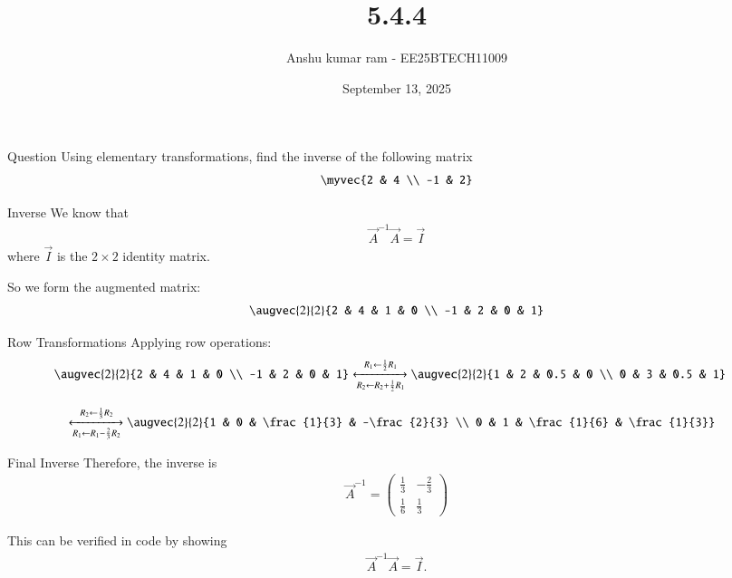 \documentclass{beamer}
\title{5.4.4}
\date{September 13, 2025}
\author{Anshu kumar ram - EE25BTECH11009}
\begin{document}
\frame{\titlepage}

\begin{frame}{Question}
Using elementary transformations, find the inverse of the following matrix
\begin{align}
\myvec{2 & 4 \\ -1 & 2}
\end{align}
\end{frame}

\begin{frame}{Inverse}
We know that
\begin{align}
\vec{A}^{-1}\vec{A} = \vec{I}
\end{align}
where $\vec{I}$ is the $2 \times 2$ identity matrix.

So we form the augmented matrix:
\begin{align}
\augvec{2}{2}{2 & 4 & 1 & 0 \\ -1 & 2 & 0 & 1}
\end{align}
\end{frame}

\begin{frame}{Row Transformations}
Applying row operations:
\begin{align}
\augvec{2}{2}{2 & 4 & 1 & 0 \\ -1 & 2 & 0 & 1}
&\xleftrightarrow[R_2 \leftarrow R_2 + \frac{1}{2}R_1]{R_1 \leftarrow \frac{1}{2}R_1}
\augvec{2}{2}{1 & 2 & 0.5 & 0 \\ 0 & 3 & 0.5 & 1}
\end{align}

\begin{align}
&\xleftrightarrow[R_1 \leftarrow R_1 - \frac{2}{3}R_2]{R_2 \leftarrow \frac{1}{3}R_2}
\augvec{2}{2}{1 & 0 & \frac{1}{3} & -\frac{2}{3} \\ 0 & 1 & \frac{1}{6} & \frac{1}{3}}
\end{align}
\end{frame}

\begin{frame}{Final Inverse}
Therefore, the inverse is
\begin{align}
\vec{A}^{-1} =
\begin{pmatrix}
\frac{1}{3} & -\frac{2}{3} \\
\frac{1}{6} & \frac{1}{3}
\end{pmatrix}
\end{align}

This can be verified in code by showing
\begin{align}
\vec{A}^{-1}\vec{A} = \vec{I}.
\end{align}
\end{frame}
\end{document}
